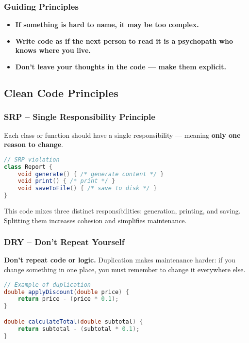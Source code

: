 \documentclass[a4paper,12pt]{article}
\begin{document}
\subsubsection{Guiding Principles}
\begin{itemize}
  \item \textbf{If something is hard to name, it may be too complex.}
  \item \textbf{Write code as if the next person to read it is a psychopath who knows where you live.}
  \item \textbf{Don’t leave your thoughts in the code — make them explicit.}
\end{itemize}

\subsection{Clean Code Principles}

\subsubsection{SRP – Single Responsibility Principle}
Each class or function should have a single responsibility — meaning \textbf{only one reason to change}.

\begin{lstlisting}[language=Java]
// SRP violation
class Report {
    void generate() { /* generate content */ }
    void print() { /* print */ }
    void saveToFile() { /* save to disk */ }
}
\end{lstlisting}

This code mixes three distinct responsibilities: generation, printing, and saving. Splitting them increases cohesion and simplifies maintenance.

\subsubsection{DRY – Don't Repeat Yourself}
\textbf{Don’t repeat code or logic.} Duplication makes maintenance harder: if you change something in one place, you must remember to change it everywhere else.

\begin{lstlisting}[language=Java]
// Example of duplication
double applyDiscount(double price) {
    return price - (price * 0.1);
}

double calculateTotal(double subtotal) {
    return subtotal - (subtotal * 0.1);
}
\end{lstlisting}
\end{document}
